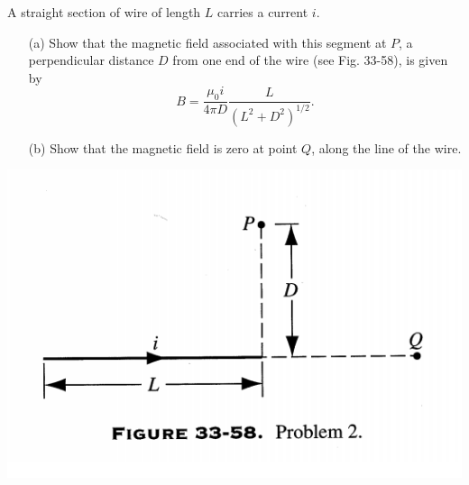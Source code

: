 \documentclass[12pt,letterpaper,boxed,cm]{hmcpset}
\newcommand{\f}[2]{\frac{#1}{#2}}
\newcommand{\pn}[1]{\left( #1 \right)}
\begin{document}
\begin{problem}[33-P2]
 A straight section of wire of length $L$ carries a current $i$. 
 \begin{enumerate}
 	\item[(a)] Show that the magnetic field associated with this segment at $P$, a perpendicular distance $D$ from one end of the wire (see Fig. 33-58), is given by
 	\[
 		B = \f{\mu_0 i}{4\pi D} \f{L}{\pn{L^2+D^2}^{1/2}}.
 	\]	
 	\item[(b)] Show that the magnetic field is zero at point $Q$, along the line of the wire.
 \end{enumerate}	
	\begin{center}
		\includegraphics[scale=0.7]{02.png}
	\end{center}
\end{problem}
\begin{solution}
\end{solution}
\end{document}
